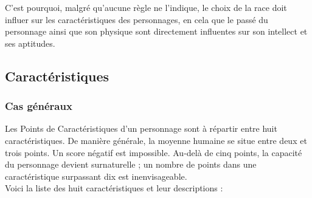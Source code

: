C’est pourquoi, malgré qu’aucune règle ne l’indique, le choix de la race doit influer sur les caractéristiques des personnages, 
en cela que le passé du personnage ainsi que son physique sont directement influentes sur son intellect et ses aptitudes.

\subsection{Caractéristiques}
\subsubsection{Cas généraux}

Les Points de Caractéristiques d’un personnage sont à répartir entre huit caractéristiques. 
De manière générale, la moyenne humaine se situe entre deux et trois points. Un score négatif est impossible. 
Au-delà de cinq points, la capacité du personnage devient surnaturelle ; un nombre de points dans une caractéristique surpassant dix est inenvisageable.\\
Voici la liste des huit caractéristiques et leur descriptions :

